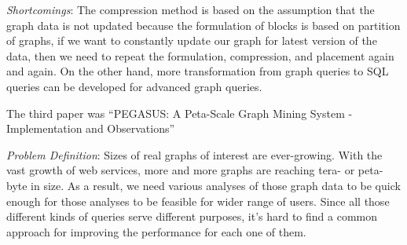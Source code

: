 \begin{itemize*}
\item {\em Shortcomings}:
      The compression method is based on the assumption that the graph data is not updated because the formulation of blocks is based on partition of graphs, if we want to constantly update our graph for latest version of the data, then we need to repeat the formulation, compression, and placement again and again. On the other hand, more transformation from graph queries to SQL queries can be developed for advanced graph queries.
\end{itemize*}

\newpage
The third paper was ``PEGASUS: A Peta-Scale Graph Mining System - Implementation and Observations''
\begin{itemize*}
\item {\em Problem Definition}: Sizes of real graphs of interest are ever-growing. With the vast growth of web services, more and more graphs are reaching tera- or peta-byte in size. As a result, we need various analyses of those graph data to be quick enough for those analyses to be feasible for wider range of users.  Since all those different kinds of queries serve different purposes, it’s hard to find a common approach for improving the performance for each one of them.\\


\end{itemize*}
